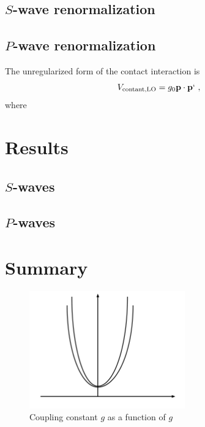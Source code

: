 \documentclass[aps,preprint,superscriptaddress]{revtex4-1}
\begin{document}
\subsection{$S$-wave renormalization}

\subsection{$P$-wave renormalization}
The unregularized form of the contact interaction is
\begin{equation}
  \label{eq:VLO-pwave}
  V_{\rm contant, LO} = g_0 {\bf p}\cdot {\bf p}`~,
\end{equation}
where 

\section{Results}
\label{sec:results}
\subsection{$S$-waves}


\subsection{$P$-waves}
\section{Summary}
\label{sec:summary}
\begin{figure}[t]
\begin{center}
\includegraphics[width=0.6\textwidth,clip=true]{g0g1flow} 
\end{center}
\caption{Coupling constant $g$ as a function of $g$}
\label{fig:g0g1flow}
\end{figure}
\end{document}
